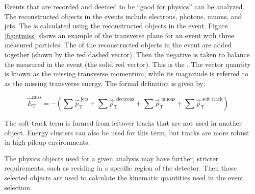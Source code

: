 Events that are recorded and deemed to be ``good for physics'' can be analyzed. The reconstructed objects in the events include electrons, photons, muons, and jets. The \etmiss is calculated using the reconstructed objects in the event. Figure \ref{fig:etmiss} shows an example of the transverse plane for an event with three measured particles. The \pt of the reconstructed objects in the event are added together (shown by the red dashed vector). Then the negative is taken to balance the measured \pt in the event (the solid red vector). This is the \etmissvec. The vector quantity \etmissvec is known as the missing transverse momentum, while its magnitude \etmiss is referred to as the missing transverse energy. The formal definition is given by:

\begin{equation}
\vec{E}_\text{T}^\text{miss} = - \left( \sum \vec{p}_\text{T}^\text{ jets} + \sum \vec{p}_\text{T}^\text{ electrons} + \sum \vec{p}_\text{T}^\text{ muons} + \sum \vec{p}_\text{T}^\text{ soft track} \right)
\end{equation}

\noindent The soft track term is formed from leftover tracks that are not used in another object. Energy clusters can also be used for this term, but tracks are more robust in high pileup environments. 

The physics objects used for a given analysis may have further, stricter requirements, such as residing in a specific region of the detector. Then those selected objects are used to calculate the kinematic quantities used in the event selection.

\clearpage

